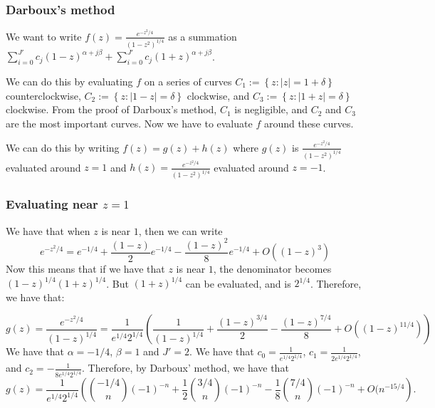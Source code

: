 \documentclass[]{article}
\begin{document}
\subsubsection{Darboux's method}

We want to write $f(z) =\frac{e^{-z^2/4}}{(1 - z^2)^{1/4}}$ as a summation $\sum_{i = 0}^{J'} c_j (1 - z)^{\alpha + j \beta} + \sum_{i = 0}^{J'} c_j (1 + z)^{\alpha + j \beta}$.

We can do this by evaluating $f$ on a series of curves $C_1 := \left\{z : |z| = 1 + \delta\right\}$ counterclockwise, $C_2 := \left\{z : |1 - z| = \delta\right\}$ clockwise, and $C_3 := \left\{z : |1 + z| = \delta\right\}$ clockwise. From the proof of Darboux's method, $C_1$ is negligible, and $C_2$ and $C_3$ are the most important curves. Now we have to evaluate $f$ around these curves. 


We can do this by writing $f(z) = g(z) + h(z)$ where $g(z)$ is $\frac{e^{-z^2/4}}{(1 - z^2)^{1/4}}$ evaluated around $z = 1$ and $h(z) = \frac{e^{-z^2/4}}{(1 - z^2)^{1/4}}$ evaluated around $z = -1$.

\subsubsection{Evaluating near $z = 1$}
 We have that when $z$ is near $1$, then we can write
\begin{equation}
	e^{-z^2/4} = e^{-1/4} + \frac{(1-z)}{2} e^{-1/4}  - \frac{(1 - z)^2}{8} e^{-1/4} + O((1 - z)^3)
\end{equation}
Now this means that if we have that $z$ is near $1$, the denominator becomes $(1 - z)^{1/4} (1 + z)^{1/4}$. But $(1 + z)^{1/4}$ can be evaluated, and is $2^{1/4}$. Therefore, we have that:

\begin{equation}
	g(z) = \frac{e^{-z^2/4}}{(1 - z)^{1/4}} = \frac{1}{e^{1/4} 2^{1/4}} \left(\frac{1}{(1 - z)^{1/4}} + \frac{(1 - z)^{3/4}}{2} - \frac{(1 - z)^{7/4}}{8} +  O((1 - z)^{11/4})\right)
\end{equation}
We have that $\alpha = -1/4$, $\beta = 1$ and $J' = 2$. We have that $c_0 = \frac{1}{e^{1/4} 2^{1/4}}$, $c_1 = \frac{1}{2 e^{1/4} 2^{1/4}}$, and $c_2 = -\frac{1}{8 e^{1/4} 2^{1/4}}$.
Therefore, by Darboux' method, we have that 
\begin{equation}
	[z^n]g(z) = \frac{1}{e^{1/4} 2^{1/4}} \left( \binom{-1/4}{n}(-1)^{-n} +  \frac{1}{2}\binom{3/4}{n}(-1)^{-n} - \frac{1}{8} \binom{7/4}{n} (-1)^{-n} + O(n^{-15/4} \right).
\end{equation}
\end{document}
